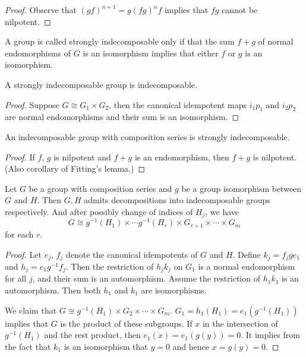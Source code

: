 \begin{proof}
  Observe that $(gf)^{n+1}=g(fg)^{n}f$ implies that $fg$ cannot be nilpotent.
\end{proof}

\begin{definition}
  A group is called strongly indecomposable only if that the sum $f+g$ of normal endomorphisms of $G$ is an isomorphism implies that either $f$ or $g$ is an isomorphism.
\end{definition}

\begin{proposition}
  A strongly indecomposable group is indecomposable.
\end{proposition}

\begin{proof}
  Suppose $G\cong G_1\times G_2$, then the canonical idempotent maps $i_1p_1$ and $i_2p_2$ are normal endomorphisms and their sum is an isomorphism.
\end{proof}

\begin{proposition}
  An indecomposable group with composition series is strongly indecomposable.
\end{proposition}

\begin{proof}
  If $f$, $g$ is nilpotent and $f+g$ is an endomorphism, then $f+g$ is nilpotent. (Also corollary of Fitting's lemma.)
\end{proof}

\begin{theorem}
  Let $G$ be a group with composition series and $g$ be a group isomorphism between $G$ and $H$. Then $G, H$ admits decompositions into indecomposable groups respectively. And after possibly change of indices of $H_j$, we have \begin{equation}
    G\cong g^{-1}(H_1)\times \dotsb g^{-1}(H_r) \times G_{r+1}\times \dotsb \times G_m
  \end{equation}
  for each $r$.
\end{theorem}

\begin{proof}
  Let $e_j$, $f_j$ denote the canonical idempotents of $G$ and $H$. Define $k_j=f_jge_1$ and $h_j=e_1g^{-1}f_j$. Then the restriction of $h_jk_j$ on $G_1$ is a normal endomorphism for all $j$, and their sum is an automorphism. Assume the restriction of $h_1k_1$ is an automorphism. Then both $h_1$ and $k_1$ are isomorphisms.

  We claim that $G\cong g^{-1}(H_1)\times G_2\times \dotsb\times G_m$. $G_1 = h_1(H_1)=e_1(g^{-1}(H_1))$ implies that $G$ is the product of these subgroups. If $x$ in the intersection of $g^{-1}(H_1)$ and the rest product, then $e_1(x)=e_1(g(y))=0$. It implies from the fact that $k_1$ is an isomorphism that $y=0$ and hence $x=g(y)=0$.
\end{proof}

